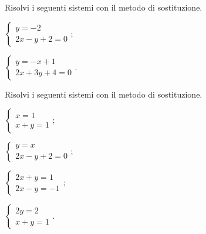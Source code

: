 \begin{esercizio}
 \label{ese:19.7}
Risolvi i seguenti sistemi con il metodo di sostituzione.
 \begin{multicols}{2}
 \begin{enumeratea}
  \item $\left\{\begin{array}{l}
     y=-2\\
     2x-y+2=0
    \end{array}\right.;$
  \item $\left\{\begin{array}{l}
	   y=-x+1\\
	   2x+3y+4=0
       \end{array}\right..$
 \end{enumeratea}
 \end{multicols}
\end{esercizio}

\begin{esercizio}[\Ast]
 \label{ese:19.8}
Risolvi i seguenti sistemi con il metodo di sostituzione.
 \begin{multicols}{2}
 \begin{enumeratea}
  \item $\left\{\begin{array}{l}
        x=1\\
        x+y=1
       \end{array}
\right.;$
\item $\left\{\begin{array}{l}
        y=x\\
        2x-y+2=0
       \end{array}\right.;$
\item $\left\{\begin{array}{l}
		2x+y=1\\
		2x-y=-1
	  \end{array}\right.;$
\item $\left\{\begin{array}{l}
	   2y=2\\
	   x+y=1
	\end{array}\right..$
 \end{enumeratea}
 \end{multicols}
\end{esercizio}


